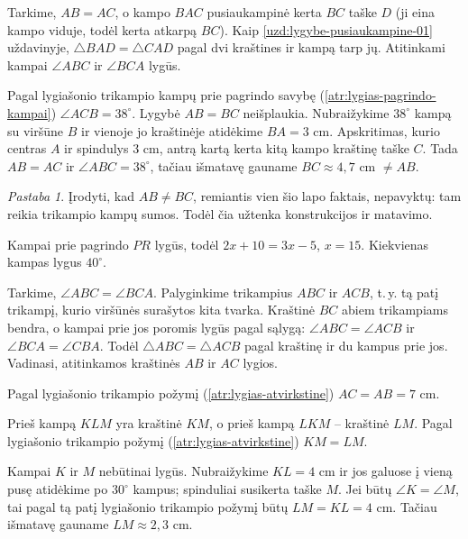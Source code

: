 \documentclass[12pt,a4paper,reqno]{amsart}
\theoremstyle{plain}\newtheorem{theorem}{Teorema}[section]
\theoremstyle{definition}
\theoremstyle{remark}\newtheorem{remark}[theorem]{Pastaba}\newtheorem*{remark*}{Pastaba}
\theoremstyle{definition}\newtheorem*{problem*}{Uždavinys}
\begin{document}
\begin{solution}[\ref{atr:lygias-pagrindo-kampai}] Tarkime, $AB=AC$, o kampo $BAC$ pusiaukampinė kerta $BC$ taške $D$ (ji eina kampo viduje, todėl kerta atkarpą $BC$). Kaip \ref{uzd:lygybe-pusiaukampine-01} uždavinyje, $\triangle BAD=\triangle CAD$ pagal dvi kraštines ir kampą tarp jų. Atitinkami kampai $\angle ABC$ ir $\angle BCA$ lygūs. \end{solution}
\begin{solution}[\ref{uzd:lygias-kampai-01}] Pagal lygiašonio trikampio kampų prie pagrindo savybę (\ref{atr:lygias-pagrindo-kampai}) $\angle ACB=38^\circ$. Lygybė $AB=BC$ neišplaukia. Nubraižykime $38^\circ$ kampą su viršūne $B$ ir vienoje jo kraštinėje atidėkime $BA=3$ cm. Apskritimas, kurio centras $A$ ir spindulys $3$ cm, antrą kartą kerta kitą kampo kraštinę taške $C$. Tada $AB=AC$ ir $\angle ABC=38^\circ$, tačiau išmatavę gauname $BC\approx4{,}7$ cm $\ne AB$.
\begin{remark*} Įrodyti, kad $AB\ne BC$, remiantis vien šio lapo faktais, nepavyktų: tam reikia trikampio kampų sumos. Todėl čia užtenka konstrukcijos ir matavimo. \end{remark*}
\end{solution}
\begin{solution}[\ref{uzd:lygias-kampai-02}] Kampai prie pagrindo $PR$ lygūs, todėl $2x+10=3x-5$, $x=15$. Kiekvienas kampas lygus $40^\circ$. \end{solution}
\begin{solution}[\ref{atr:lygias-atvirkstine}] Tarkime, $\angle ABC=\angle BCA$. Palyginkime trikampius $ABC$ ir $ACB$, t.\,y. tą patį trikampį, kurio viršūnės surašytos kita tvarka. Kraštinė $BC$ abiem trikampiams bendra, o kampai prie jos poromis lygūs pagal sąlygą: $\angle ABC=\angle ACB$ ir $\angle BCA=\angle CBA$. Todėl $\triangle ABC=\triangle ACB$ pagal kraštinę ir du kampus prie jos. Vadinasi, atitinkamos kraštinės $AB$ ir $AC$ lygios. \end{solution}
\begin{solution}[\ref{uzd:lygias-atvirkstine-01}] Pagal lygiašonio trikampio požymį (\ref{atr:lygias-atvirkstine}) $AC=AB=7$ cm. \end{solution}
\begin{solution}[\ref{uzd:lygias-atvirkstine-02}] Prieš kampą $KLM$ yra kraštinė $KM$, o prieš kampą $LKM$ – kraštinė $LM$. Pagal lygiašonio trikampio požymį (\ref{atr:lygias-atvirkstine}) $KM=LM$.\par
Kampai $K$ ir $M$ nebūtinai lygūs. Nubraižykime $KL=4$ cm ir jos galuose į vieną pusę atidėkime po $30^\circ$ kampus; spinduliai susikerta taške $M$. Jei būtų $\angle K=\angle M$, tai pagal tą patį lygiašonio trikampio požymį būtų $LM=KL=4$ cm. Tačiau išmatavę gauname $LM\approx2{,}3$ cm. \end{solution}
\end{document}
